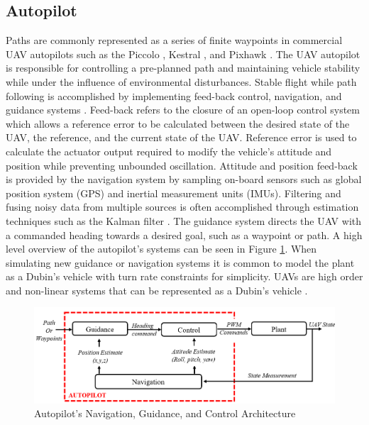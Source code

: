 \documentclass[numbered,pdftex]{ohio-etd}
\begin{document}
\subsection{Autopilot}
Paths are commonly represented as a series of finite waypoints in commercial UAV autopilots such as  the Piccolo \cite{piccolo}, Kestral \cite{kestrel}, and Pixhawk \cite{pix}. The UAV autopilot is responsible for controlling a pre-planned path and maintaining vehicle stability while under the influence of environmental disturbances. Stable flight while path following is accomplished by implementing feed-back control, navigation, and guidance systems \cite{beard_small_2012}. Feed-back refers to the closure of an open-loop control system which allows a reference error to be calculated between the desired state of the UAV, the reference, and the current state of the UAV. Reference error is used to calculate the actuator output required to modify the vehicle's attitude and position while preventing unbounded oscillation. Attitude and position feed-back is provided by the navigation system by sampling on-board sensors such as global position system (GPS) and inertial measurement units (IMUs). Filtering and fusing noisy data from multiple sources is often accomplished through estimation techniques such as the Kalman filter \cite{de_marina_guidance_2017}. The guidance system directs the UAV with a commanded heading towards a desired goal, such as a waypoint or path. A high level overview of the autopilot's systems can be seen in Figure \ref{fig:autopilotloops}. When simulating new guidance or navigation systems it is common to model the plant as a Dubin's vehicle with turn rate constraints for simplicity. UAVs are high order and non-linear systems that can be represented as a Dubin's vehicle \cite{beard_small_2012}.



%
%
%




\begin{figure}[H]
	\centering
	\includegraphics[width=15cm]{PaperFigures/autopilotLoops2}
	\caption{Autopilot's Navigation, Guidance, and Control Architecture}
	\label{fig:autopilotloops}
\end{figure}
\end{document}
